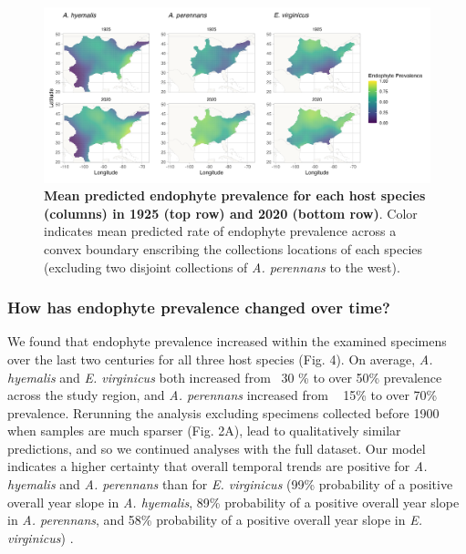 \documentclass[11pt]{article}
\begin{document}
\begin{figure}[H]
	\label{fig:prevalence_map}
	\centering
	\includegraphics[width = \linewidth]{prevalence_map.png}
	\caption{\textbf{Mean predicted endophyte prevalence for each host species (columns) in 1925 (top row) and 2020 (bottom row)}. Color indicates mean predicted rate of endophyte prevalence across a convex boundary enscribing the collections locations of each species (excluding two disjoint collections of \emph{A. perennans} to the west).}
\end{figure}


\subsubsection*{How has endophyte prevalence changed over time?}
We found that endophyte prevalence increased within the examined specimens over the last two centuries for all three host species (Fig. 4). 
On average, \emph{A. hyemalis} and \emph{E. virginicus} both increased from ~30 \% to over 50\% prevalence across the study region, and \emph{A. perennans} increased from ~ 15\% to over 70\% prevalence.
Rerunning the analysis excluding specimens collected before 1900 when samples are much sparser (Fig. 2A), lead to qualitatively similar predictions, and so we continued analyses with the full dataset. 
Our model indicates a higher certainty that overall temporal trends are positive for \emph{A. hyemalis} and \emph{A. perennans} than for \emph{E. virginicus} (99\% probability of a positive overall year slope in \emph{A. hyemalis}, 89\% probability of a positive overall year slope in \emph{A. perennans}, and 58\% probability of a positive overall year slope in \emph{E. virginicus}) .
\end{document}

